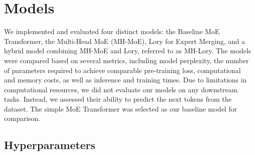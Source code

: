 \documentclass[12pt]{article}
\begin{document}

\section{Models}

We implemented and evaluated four distinct models: the Baseline MoE Transformer, the Multi-Head MoE (MH-MoE), Lory for Expert Merging, and a hybrid model combining MH-MoE and Lory, referred to as MH-Lory. The models were compared based on several metrics, including model perplexity, the number of parameters required to achieve comparable pre-training loss, computational and memory costs, as well as inference and training times.
Due to limitations in computational resources, we did not evaluate our models on any downstream tasks. Instead, we assessed their ability to predict the next tokens from the dataset. The simple MoE Transformer was selected as our baseline model for comparison.

\subsection{Hyperparameters}
\end{document}
